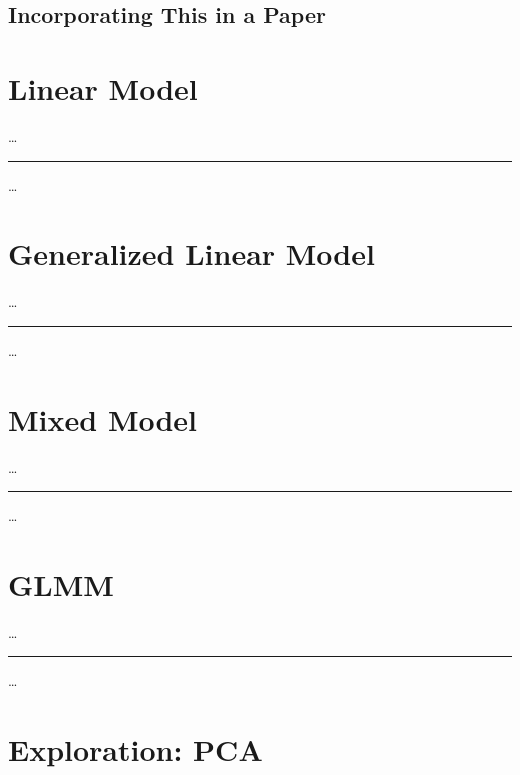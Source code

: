 \documentclass[
]{book}
\begin{document}
\hypertarget{incorporating-this-in-a-paper-2}{%
\section{Incorporating This in a Paper}\label{incorporating-this-in-a-paper-2}}

\hypertarget{linear-model}{%
\chapter{Linear Model}\label{linear-model}}

\ldots{}

\begin{center}\rule{0.5\linewidth}{0.5pt}\end{center}

\ldots{}

\hypertarget{generalized-linear-model}{%
\chapter{Generalized Linear Model}\label{generalized-linear-model}}

\ldots{}

\begin{center}\rule{0.5\linewidth}{0.5pt}\end{center}

\ldots{}

\hypertarget{mixed-model}{%
\chapter{Mixed Model}\label{mixed-model}}

\ldots{}

\begin{center}\rule{0.5\linewidth}{0.5pt}\end{center}

\ldots{}

\hypertarget{glmm}{%
\chapter{GLMM}\label{glmm}}

\ldots{}

\begin{center}\rule{0.5\linewidth}{0.5pt}\end{center}

\ldots{}

\hypertarget{exploration-pca}{%
\chapter{Exploration: PCA}\label{exploration-pca}}
\end{document}
